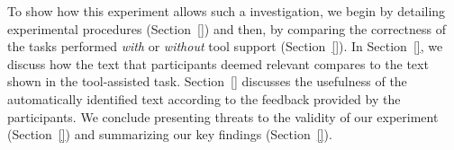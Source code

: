 



To show how this experiment allows such a investigation, we begin by detailing experimental procedures (Section~\ref{})
and then, by comparing the correctness of the tasks performed \textit{with} or \textit{without} tool support (Section~\ref{}).
In Section~\ref{}, we discuss how  the text that participants deemed relevant compares to the text 
shown in the tool-assisted task. Section~\ref{} discusses the usefulness of the automatically identified text according to the feedback provided by the participants.
We conclude presenting threats to the validity of our experiment (Section~\ref{}) and 
 summarizing our key findings (Section~\ref{}).






































